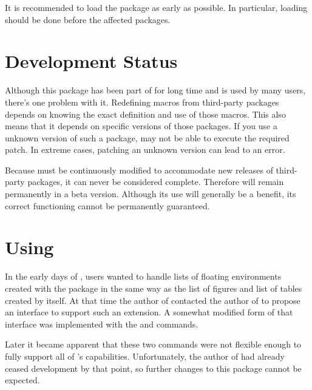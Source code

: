 It is recommended to load the  package as early as
possible. In particular, loading should be done before the affected packages.

\section{Development Status}
\label{scr:scrhack.draft}

Although this package has been part of \KOMAScript{} for long time and is used
by many users, there's one problem with it. Redefining macros from third-party
packages depends on knowing the exact definition and use of those macros. This
also means that it depends on specific versions of those packages. If you use
a unknown version of such a package,  may not be able to
execute the required patch. In extreme cases, patching an unknown version can
lead to an error.

Because  must be continuously modified to accommodate new
releases of third-party packages, it can never be considered complete.
Therefore  will remain permanently in a beta version.
Although its use will generally be a benefit, its correct functioning cannot
be permanently guaranteed.


\section{Using }

In the early days of \KOMAScript{}, users wanted to handle lists of floating
environments created with the
 package in the
same way as the list of figures and list of tables created by \KOMAScript{}
itself. At that time the author of \KOMAScript{} contacted the author of
 to propose an interface to support such an extension. A
somewhat modified form of that interface was implemented with the
 and
 commands.

Later it became apparent that these two commands were not flexible enough to
fully support all of \KOMAScript's capabilities. Unfortunately, the author of
 had already ceased development by that point, so further
changes to this package cannot be expected.

